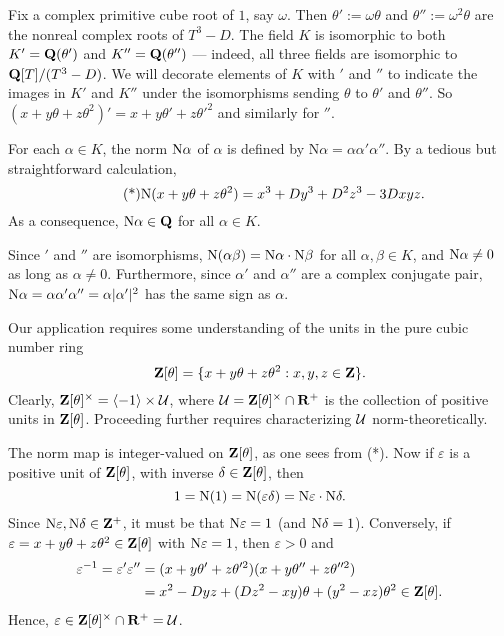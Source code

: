 Fix a complex primitive cube root of $1$, say $\omega$. Then $\theta' := \omega\theta$ and $\theta'' := \omega^2\theta$ are the nonreal complex roots of $T^3-D$. The field $K$ is isomorphic to both $K' = \mathbf{Q}(\theta')$ and $K'' = \mathbf{Q}(\theta'')$ --- indeed, all three fields are isomorphic to $\mathbf{Q}[T]/(T^3-D)$. We will decorate elements of $K$ with $'$ and $''$ to indicate the images in $K'$ and $K''$ under the isomorphisms sending $\theta$ to $\theta'$ and $\theta''$. So $(x+y\theta + z\theta^2)' = x + y\theta' + z\theta'^2$ and similarly for $''$.

For each $\alpha \in K$, the \textsf{norm} $\mathrm{N}\alpha$ of $\alpha$ is defined by $\mathrm{N}\alpha= \alpha \alpha' \alpha''$. By a tedious but straightforward calculation,
\begin{equation}\tag{*} \mathrm{N}(x+y\theta+z\theta^2) = x^3 + D y^3 + D^2 z^3 - 3Dxyz.\end{equation}
As a consequence, $\mathrm{N}\alpha \in \mathbf{Q}$ for all $\alpha \in K$.

Since $'$ and $''$ are isomorphisms, $\mathrm{N}(\alpha\beta) = \mathrm{N}\alpha \cdot \mathrm{N}\beta$ for all $\alpha,\beta \in K$, and $\mathrm{N}\alpha \ne 0$ as long as $\alpha \ne 0$. Furthermore, since $\alpha'$ and $\alpha''$ are a complex conjugate pair, $\mathrm{N}\alpha = \alpha \alpha' \alpha'' = \alpha |\alpha'|^2$ has the same sign as $\alpha$. 

Our application requires some understanding of the units in the \textsf{pure cubic number ring} $$\mathbf{Z}[\theta] = \{x+y\theta + z\theta^2: x, y, z \in \mathbf{Z}\}.$$ Clearly, $\mathbf{Z}[\theta]^{\times} = \langle -1\rangle \times \mathcal{U}$, where $\mathcal{U} = \mathbf{Z}[\theta]^{\times} \cap \mathbf{R}^{+}$ is the collection of positive units in $\mathbf{Z}[\theta]$. Proceeding further requires characterizing $\mathcal{U}$ norm-theoretically.

The norm map is integer-valued on $\mathbf{Z}[\theta]$, as one sees from (*). Now if $\varepsilon$ is a positive unit of $\mathbf{Z}[\theta]$, with inverse $\delta \in \mathbf{Z}[\theta]$, then 
\[ 1= \mathrm{N}(1) = \mathrm{N}(\varepsilon\delta) = \mathrm{N}\varepsilon \cdot \mathrm{N}\delta. \]
Since $\mathrm{N}\varepsilon, \mathrm{N}\delta \in \mathbf{Z}^{+}$, it must be that $\mathrm{N}\varepsilon= 1$ (and $\mathrm{N}\delta = 1$). Conversely, if $\varepsilon = x+y\theta + z\theta^2 \in \mathbf{Z}[\theta]$ with $\mathrm{N}\varepsilon=1$, then $\varepsilon > 0$ and
\begin{align*} \varepsilon^{-1} = \varepsilon' \varepsilon'' &= (x+y\theta' + z\theta'^2) (x+y\theta'' + z\theta''^2)
\\ &= x^2 - Dyz + (Dz^2-xy)\theta + (y^2-xz)\theta^2 \in \mathbf{Z}[\theta]. \end{align*}
Hence, $\varepsilon \in \mathbf{Z}[\theta]^{\times} \cap \mathbf{R}^{+} = \mathcal{U}$.

